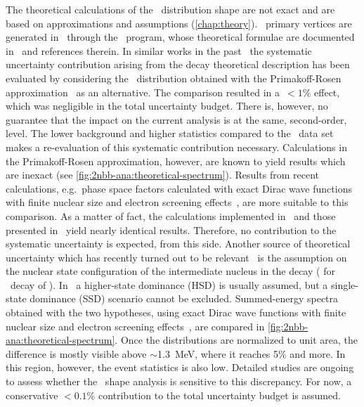 \begin{description}[wide]
  \item[Theoretical \nnbb\ decay model] The theoretical calculations of the \nnbb\
    distribution shape are not exact and are based on approximations and assumptions
    (\cref{chap:theory}).  \nnbb\ primary vertices are generated in \mage\ through the
    \decayzero\ program, whose theoretical formulae are documented
    in~\cite{Ponkratenko2000} and references therein.  In similar works in the
    past~\cite{Agostini2015a, Agostini2012a} the systematic uncertainty contribution
    arising from the decay theoretical description has been evaluated by considering the
    \nnbb\ distribution obtained with the Primakoff-Rosen
    approximation~\cite{Primakoff1959} as an alternative. The comparison resulted in
    a~$<1$\% effect, which was negligible in the total uncertainty budget.  There is,
    however, no guarantee that the impact on the current analysis is at the same,
    second-order, level. The lower background and higher statistics compared to the
    \phaseone\ data set makes a re-evaluation of this systematic contribution necessary.
    Calculations in the Primakoff-Rosen approximation, however, are known to yield results
    which are inexact (see \cref{fig:2nbb-ana:theoretical-spectrum}). Results from recent
    calculations, e.g.~phase space factors calculated with exact Dirac wave functions with
    finite nuclear size and electron screening effects~\cite{Kotila2012}, are more
    suitable to this comparison. As a matter of fact, the calculations implemented in
    \decayzero\ and those presented in~\cite{Kotila2012} yield nearly identical results.
    Therefore, no contribution to the systematic uncertainty is expected, from this side.
    \newpar
    Another source of theoretical uncertainty which has recently turned out to be
    relevant~\cite{Arnold2019, Azzolini2019a} is the assumption on the nuclear state
    configuration of the intermediate nucleus in the decay (\nuc{As}{76} for \nnbb\ decay
    of \gesix). In \gesix\ a higher-state dominance (HSD) is usually assumed, but a
    single-state dominance (SSD) scenario cannot be excluded. Summed-energy spectra
    obtained with the two hypotheses, using exact Dirac wave functions with finite nuclear
    size and electron screening effects~\cite{Kotila2012}, are compared in
    \cref{fig:2nbb-ana:theoretical-spectrum}. Once the distributions are normalized to
    unit area, the difference is mostly visible above $\sim$1.3~MeV, where it reaches 5\%
    and more. In this region, however, the event statistics is also low. Detailed studies
    are ongoing to assess whether the \nnbb\ shape analysis is sensitive to this
    discrepancy. For now, a conservative $<0.1$\% contribution to the total uncertainty
    budget is assumed.


\end{description}
